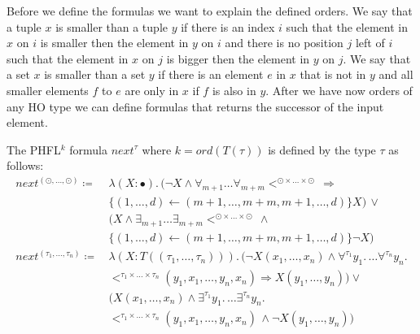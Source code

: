 Before we define the formulas we want to explain the defined orders. We say that a tuple $x$ is smaller than a tuple
$y$ if there is an index $i$ such that the element in $x$ on $i$ is smaller then the element in $y$ on $i$ and there
is no position $j$ left of $i$ such that the element in $x$ on $j$ is bigger then the element in $y$ on $j$. We say
that a set $x$ is smaller than a set $y$ if there is an element $e$ in $x$ that is not in $y$ and all smaller
elements $f$ to $e$ are only in $x$ if $f$ is also in $y$. After we have now orders of any HO type we can define
formulas that returns the successor of the input element.

\begin{definition}
    The PHFL$^k$ formula $next^\tau$ where $k = ord(T(\tau))$ is defined by the type $\tau$ as follows:
    \begin{align*}
        next^{(\odot, \dots, \odot)} \coloneqq &\,\lambda (X \colon \bullet).\, (\neg X \wedge \forall_{m +
        1}\dots\forall_{m + m}<^{\odot \times \dots \times \odot}\, \Rightarrow \\&\,\{(1, \dots, d) \leftarrow (m +
        1, \dots, m + m, m + 1, \dots, d)\} X) \,\vee \\&\,(X \wedge \exists_{m + 1}\dots\exists_{m + m} <^{\odot
        \times \dots \times \odot} \,\wedge \\&\,\{(1, \dots, d) \leftarrow (m + 1, \dots, m + m, m + 1, \dots, d)\}
        \neg X)\\
        next^{(\tau_1, \dots, \tau_n)} \coloneqq &\,\lambda (X \colon T ((\tau_1, \dots, \tau_n))).\,(\neg X(x_1,
        \dots, x_n)\wedge \forall^{\tau_1}y_1.\, \dots \forall^{\tau_n}y_n. \\&\, <^{\tau_1 \times \dots \times
        \tau_n}(y_1, x_1, \dots, y_n, x_n) \Rightarrow  X(y_1, \dots, y_n)) \vee \\&\,(X(x_1, \dots, x_n) \wedge
        \exists^{\tau_1}y_1.\, \dots \exists^{\tau_n}y_n.\, \\&\,<^{\tau_1 \times \dots \times \tau_n} (y_1, x_1,
        \dots, y_n, x_n)\,\wedge \neg X(y_1, \dots, y_n))
    \end{align*}
\end{definition}

